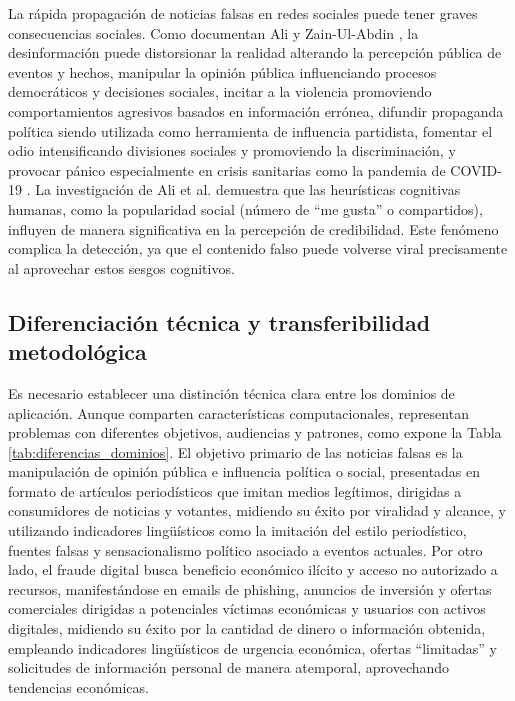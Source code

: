La rápida propagación de noticias falsas en redes sociales puede tener graves consecuencias sociales. Como documentan Ali y Zain-Ul-Abdin \cite{ali2020posttruth}, la desinformación puede distorsionar la realidad alterando la percepción pública de eventos y hechos, manipular la opinión pública influenciando procesos democráticos y decisiones sociales, incitar a la violencia promoviendo comportamientos agresivos basados en información errónea, difundir propaganda política siendo utilizada como herramienta de influencia partidista, fomentar el odio intensificando divisiones sociales y promoviendo la discriminación, y provocar pánico especialmente en crisis sanitarias como la pandemia de COVID-19 \cite{perez2020fake}. La investigación de Ali et al. \cite{ali2021fake} demuestra que las heurísticas cognitivas humanas, como la popularidad social (número de ``me gusta'' o compartidos), influyen de manera significativa en la percepción de credibilidad. Este fenómeno complica la detección, ya que el contenido falso puede volverse viral precisamente al aprovechar estos sesgos cognitivos.

\subsection{Diferenciación técnica y transferibilidad metodológica}

Es necesario establecer una distinción técnica clara entre los dominios de aplicación. Aunque comparten características computacionales, representan problemas con diferentes objetivos, audiencias y patrones, como expone la Tabla \ref{tab:diferencias_dominios}. El objetivo primario de las noticias falsas es la manipulación de opinión pública e influencia política o social, presentadas en formato de artículos periodísticos que imitan medios legítimos, dirigidas a consumidores de noticias y votantes, midiendo su éxito por viralidad y alcance, y utilizando indicadores lingüísticos como la imitación del estilo periodístico, fuentes falsas y sensacionalismo político asociado a eventos actuales. Por otro lado, el fraude digital busca beneficio económico ilícito y acceso no autorizado a recursos, manifestándose en emails de phishing, anuncios de inversión y ofertas comerciales dirigidas a potenciales víctimas económicas y usuarios con activos digitales, midiendo su éxito por la cantidad de dinero o información obtenida, empleando indicadores lingüísticos de urgencia económica, ofertas ``limitadas'' y solicitudes de información personal de manera atemporal, aprovechando tendencias económicas.

